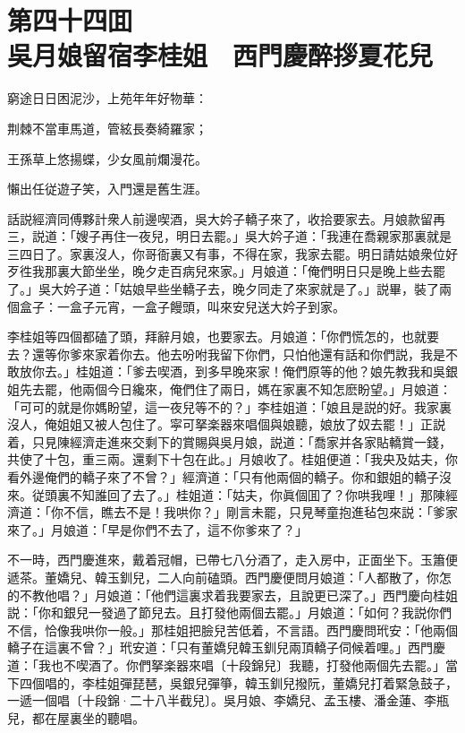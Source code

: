 
\chapter*{第四十四囬　\\吳月娘留宿李桂姐　西門慶醉拶夏花兒}


\begin{myquote}
窮途日日困泥沙，上苑年年好物華：

荆棘不當車馬道，管絃長奏綺羅家；

王孫草上悠揚蝶，少女風前爛漫花。

懶出任従遊子笑，入門還是舊生涯。
\end{myquote}

話説經濟同傅夥計衆人前邊喫酒，吳大妗子轎子來了，收拾要家去。月娘款留再三，説道：「嫂子再住一夜兒，明日去罷。」吳大妗子道：「我連在喬親家那裏就是三四日了。家裏沒人，你哥衙裏又有事，不得在家，我家去罷。明日請姑娘衆位好歹徃我那裏大節坐坐，晚夕走百病兒來家。」月娘道：「俺們明日只是晚上些去罷了。」吳大妗子道：「姑娘早些坐轎子去，晚夕同走了來家就是了。」説畢，裝了兩個盒子：一盒子元宵，一盒子饅頭，叫來安兒送大妗子到家。

李桂姐等四個都磕了頭，拜辭月娘，也要家去。月娘道：「你們慌怎的，也就要去？還等你爹來家着你去。他去吩咐我留下你們，只怕他還有話和你們説，我是不敢放你去。」桂姐道：「爹去喫酒，到多早晚來家！俺們原等的他？娘先教我和吳銀姐先去罷，他兩個今日纔來，俺們住了兩日，媽在家裏不知怎麽盼望。」月娘道：「可可的就是你媽盼望，這一夜兒等不的？」李桂姐道：「娘且是説的好。我家裏沒人，俺姐姐又被人包住了。寜可拏楽器來唱個與娘聽，娘放了奴去罷！」正説着，只見陳經濟走進來交剩下的賞賜與吳月娘，説道：「喬家并各家貼轎賞一錢，共使了十包，重三兩。還剩下十包在此。」月娘收了。桂姐便道：「我央及姑夫，你看外邊俺們的轎子來了不曾？」經濟道：「只有他兩個的轎子。你和銀姐的轎子沒來。従頭裏不知誰回了去了。」桂姐道：「姑夫，你眞個囬了？你哄我哩！」那陳經濟道：「你不信，瞧去不是！我哄你？」剛言未罷，只見琴童抱進毡包來説：「爹家來了。」月娘道：「早是你們不去了，這不你爹來了？」

不一時，西門慶進來，戴着冠帽，已帶七八分酒了，走入房中，正面坐下。玉簫便遞茶。董嬌兒、韓玉釧兒，二人向前磕頭。西門慶便問月娘道：「人都散了，你怎的不教他唱？」月娘道：「他們這裏求着我要家去，且說更已深了。」西門慶向桂姐説：「你和銀兒一發過了節兒去。且打發他兩個去罷。」月娘道：「如何？我説你們不信，恰像我哄你一般。」那桂姐把臉兒苦低着，不言語。西門慶問玳安：「他兩個轎子在這裏不曾？」玳安道：「只有董嬌兒韓玉釧兒兩頂轎子伺候着哩。」西門慶道：「我也不喫酒了。你們拏楽器來唱〔十段錦兒〕我聽，打發他兩個先去罷。」當下四個唱的，李桂姐彈琵琶，吳銀兒彈箏，韓玉釧兒撥阮，董嬌兒打着緊急鼓子，一遞一個唱〔十段錦·二十八半截兒〕。吳月娘、李嬌兒、孟玉樓、潘金蓮、李瓶兒，都在屋裏坐的聽唱。

